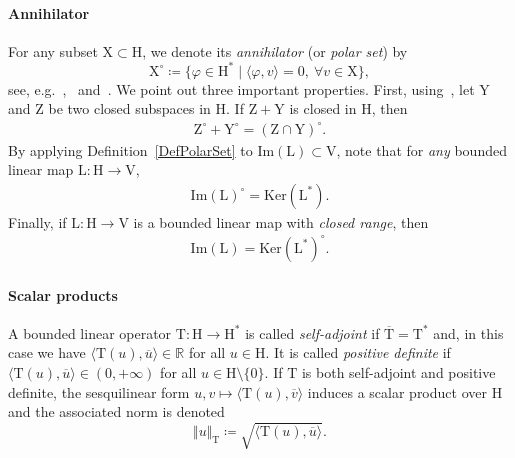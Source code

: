\documentclass[a4paper,11pt]{article}
\newcommand{\RR}{\mathbb{R}}
\newcommand{\mrm}{\mathrm}
\newcommand{\mL}{\mathrm{L}}
\newcommand{\mH}{\mathrm{H}}
\newcommand{\mV}{\mathrm{V}}
\newcommand{\mT}{\mathrm{T}}
\newcommand{\mX}{\mathrm{X}}
\newcommand{\mY}{\mathrm{Y}}
\newcommand{\mZ}{\mathrm{Z}}
\begin{document}
\paragraph{Annihilator}

For any subset $\mX\subset \mH$, we denote its \emph{annihilator} (or \emph{polar set}) by
\begin{equation}\label{DefPolarSet}
  \mX^{\circ} \coloneq\{ \varphi\in \mH^* \mid \langle \varphi,v\rangle = 0,\ \forall v\in \mX\},
\end{equation}
see, e.g.~\cite[§4.6]{Rudin19991book},~\cite[§1.3]{Brezis2011FAS}
and~\cite[§4.1.4--4.1.5]{BoffiBrezziFortin2013book}. We point out three
important properties.  First, using~\cite[Theorem 2.16]{Brezis2011FAS}, let
\(\mY\) and \(\mZ\) be two closed subspaces in \(\mH\). If \(\mZ+\mY\) is
closed in \(\mH\), then
\begin{align}\label{PropSumOfAnnihilator}
   \mZ^{\circ} + \mY^{\circ} = \left(\mZ \cap \mY\right)^{\circ}.
\end{align}
By applying Definition~\eqref{DefPolarSet} to \(\mrm{Im}(\mL) \subset \mV\), note that for \emph{any} bounded linear map \(\mL:\mH\to\mV\),
\begin{align}\label{eq:polarOfImage}
  \mrm{Im}(\mL)^{\circ} = \mrm{Ker} (\mL^*).
\end{align}
Finally, if \(\mL:\mH\to\mV\) is a bounded linear map with \emph{closed range}, then
\begin{align}\label{ClosedRangeTheorem}
  \mrm{Im}(\mL) = \mrm{Ker} (\mL^*)^{\circ}.
\end{align}

\paragraph{Scalar products} A bounded linear operator $\mT\colon\mH\to \mH^*$
is called \emph{self-adjoint} if $\overline{\mT} = \mT^{*}$ and, in this case
we have $\langle \mT(u),\overline{u}\rangle\in \RR$ for all $u\in\mH$.
It is called \emph{positive definite} if $\langle \mT(u),\overline{u}\rangle
\in (0,+\infty)$ for all $u\in\mH\setminus\{0\}$. If $\mT$ is
both self-adjoint and positive definite, the sesquilinear form
$u,v\mapsto \langle \mT(u),\overline{v}\rangle$ induces a scalar
product over $\mH$ and the associated norm is denoted
\begin{equation*}
  \Vert u\Vert_{\mT}\coloneq\sqrt{\langle \mT(u),\overline{u}\rangle}.
\end{equation*}
\end{document}
